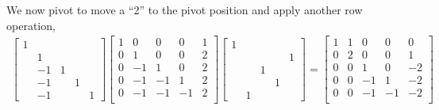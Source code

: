 \documentclass[10pt]{article}
\begin{document}
\begin{solution}[Solution]
\begin{enumerate}
    We now pivot to move a ``2'' to the pivot position and apply another row operation,
    {\footnotesize
    \begin{align*}
        \left[\begin{array}{rrrrr}
            1 \\
            & 1 \\
            & -1& 1 \\
            & -1& & 1 \\
            & -1& & & 1 
       \end{array}\right]
         \left[\begin{array}{ccccc}
            1 & 0 & 0 & 0 & 1 \\
            0 & 1 & 0 & 0 & 2 \\
            0 & -1 & 1 & 0 & 2 \\
            0 & -1 & -1 & 1 & 2 \\
            0 & -1 & -1 & -1 & 2 \\
        \end{array}\right]
        \left[\begin{array}{rrrrr}
            1 \\
            & & & & 1 \\
            & & 1 \\
            & & & 1 \\
            & 1 
       \end{array}\right]
        =
         \left[\begin{array}{ccccc}
            1 & 1 & 0 & 0 & 0 \\
            0 & 2 & 0 & 0 & 1 \\
            0 & 0 & 1 & 0 & -2 \\
            0 & 0 & -1 & 1 & -2 \\
            0 & 0 & -1 & -1 & -2 \\
        \end{array}\right] 
   \end{align*}
   }


\end{enumerate}
\end{solution}
\end{document}
